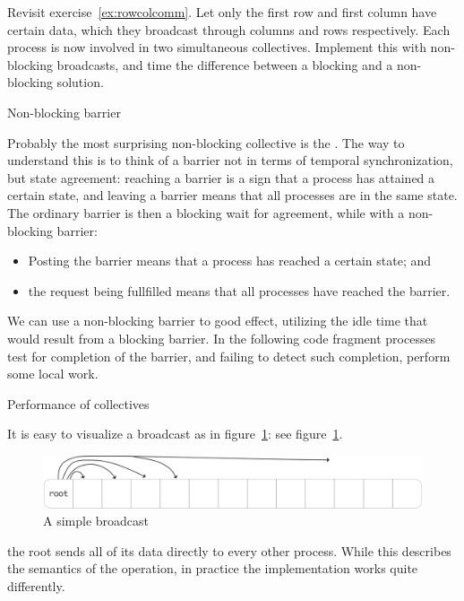\begin{exercise}
  \label{ex:procgridnonblock}
  Revisit exercise~\ref{ex:rowcolcomm}. Let only the first row and
  first column have certain data, which they broadcast through columns
  and rows respectively. Each process is now involved in two
  simultaneous collectives. Implement this with non-blocking
  broadcasts, and time the difference between a blocking and a
  non-blocking solution.
\end{exercise}




 {Non-blocking barrier}
\label{sec:ibarrier}

Probably the most surprising non-blocking collective is the
. The way to understand this is to think of
a barrier not in terms of temporal synchronization, but state
agreement: reaching a barrier is a sign that a process has attained a
certain state, and leaving a barrier means that all processes are in
the same state. The ordinary barrier is then a blocking wait for
agreement, while with a non-blocking barrier:
\begin{itemize}
\item Posting the barrier means that a process has reached a certain
  state; and
\item the request being fullfilled means that all processes have
  reached the barrier.
\end{itemize}


We can use a non-blocking barrier to good effect, utilizing the idle
time that would result from a blocking barrier. In the following code
fragment processes test for completion of the barrier, and failing to
detect such completion, perform some local work.


 {Performance of collectives}

It is easy to visualize a broadcast as in figure~\ref{fig:bcast-simple}:
see figure~\ref{fig:bcast-simple}.
\begin{figure}[ht]
  \includegraphics[scale=.08]{graphics/bcast-simple}
  \caption{A simple broadcast}
  \label{fig:bcast-simple}
\end{figure}
the root sends all of its data directly to every other process.
While this describes the semantics of the operation, in practice
the implementation works quite differently.


